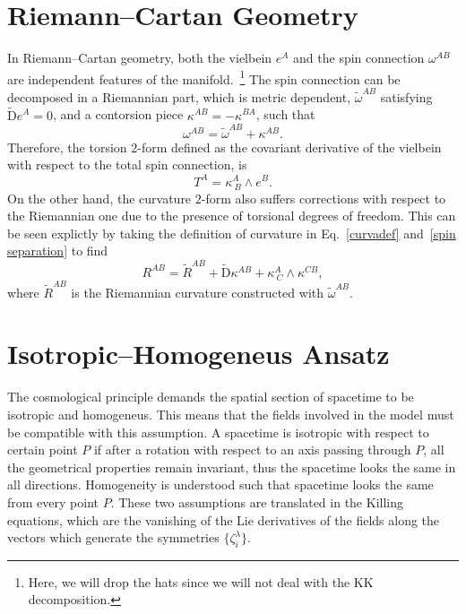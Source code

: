 \documentclass[aps,prd,12pt,superscriptaddress,showpacs,showkeys,longbibliography,reprint,nofootinbib]{revtex4-1}
\begin{document}
\appendix

\section{Riemann--Cartan Geometry\label{Riemann-Cartan}}

In Riemann--Cartan geometry, both the vielbein $e^A$ and the spin connection $\omega^{AB}$ are independent features of the manifold.~\footnote{Here, we will drop the hats since we will not deal with the KK decomposition.} The spin connection can be decomposed in a Riemannian part, which is metric dependent, $\tilde{\omega}^{AB}$ satisfying $\tilde{\mbox{D}}e^A=0$, and a contorsion piece $\kappa^{AB}=-\kappa^{BA}$, such that 
\begin{equation}\label{spin separation}
  \omega^{AB}=\tilde{\omega}^{AB}+\kappa^{AB}.
\end{equation} 
Therefore, the torsion 2-form defined as the covariant derivative of the vielbein with respect to the total spin connection, is
\begin{equation}
  T^A=\kappa^A_{\ B}\wedge e^B.
\end{equation}
On the other hand, the curvature $2$-form also suffers corrections with respect to the Riemannian one due to the presence of torsional degrees of freedom. This can be seen explictly by taking the definition of curvature in Eq.~\eqref{curvadef} and~\eqref{spin separation} to find
\begin{equation}\label{curvature decomp}
  R^{AB} = \tilde{R}^{AB} + \tilde{\mbox{D}}\kappa^{AB} + \kappa^A_{\ C}\wedge\kappa^{CB},
\end{equation}
where $\tilde{R}^{AB}$ is the Riemannian curvature constructed with $\tilde{\omega}^{AB}$.


\section{Isotropic--Homogeneus Ansatz\label{homotropic}}

The cosmological principle demands the spatial section of spacetime to be isotropic and homogeneus. This means that the fields involved in the model must be compatible with this assumption. A spacetime is isotropic with respect to certain point $P$ if after a rotation with respect to an axis passing through $P$, all the geometrical properties remain invariant, thus the spacetime looks the same in all directions. Homogeneity is understood such that spacetime looks the same from every point $P$. These two assumptions are translated in the Killing equations, which are the vanishing of the Lie derivatives of the fields along the vectors which generate the symmetries $\{\zeta^\lambda_{i}\}$. 
\end{document}
